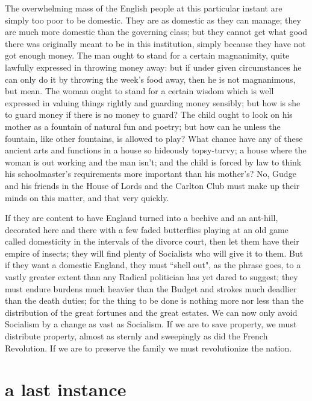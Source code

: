 \documentclass[final,10pt,letterpaper,twocolumn,openany]{book}
\begin{document}
The
overwhelming mass of the English people at this particular instant are
simply too poor to be domestic. They are as domestic as they can manage;
they are much more domestic than the governing class; but they cannot get
what good there was originally meant to be in this institution, simply
because they have not got enough money. The man ought to stand for a
certain magnanimity, quite lawfully expressed in throwing money away:
but if under given circumstances he can only do it by throwing the week's
food away, then he is not magnanimous, but mean. The woman ought to
stand for a certain wisdom which is well expressed in valuing things
rightly and guarding money sensibly; but how is she to guard money if
there is no money to guard? The child ought to look on his mother as a
fountain of natural fun and poetry; but how can he unless the fountain, like
other fountains, is allowed to play? What chance have any of these ancient
arts and functions in a house so hideously topsy-turvy; a house where the
woman is out working and the man isn't; and the child is forced by law to
think his schoolmaster's requirements more important than his mother's?
No, Gudge and his friends in the House of Lords and the Carlton Club
must make up their minds on this matter, and that very quickly. 

If they are
content to have England turned into a beehive and an ant-hill, decorated
here and there with a few faded butterflies playing at an old game called
domesticity in the intervals of the divorce court, then let them have their
empire of insects; they will find plenty of Socialists who will give it to
them. But if they want a domestic England, they must ``shell out", as the
phrase goes, to a vastly greater extent than any Radical politician has yet
dared to suggest; they must endure burdens much heavier than the Budget
and strokes much deadlier than the death duties; for the thing to be done is
nothing more nor less than the distribution of the great fortunes and the
great estates. We can now only avoid Socialism by a change as vast as
Socialism. If we are to save property, we must distribute property, almost
as sternly and sweepingly as did the French Revolution. If we are to
preserve the family we must revolutionize the nation.

\section{a last instance}
\end{document}
